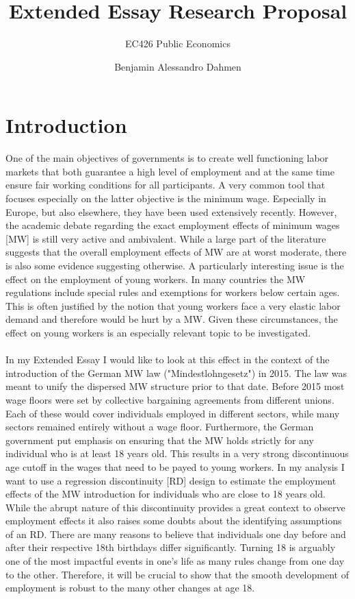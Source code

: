 \documentclass[11pt]{scrartcl}
\title{Extended Essay Research Proposal}
\subtitle{EC426 Public Economics}
\author{Benjamin Alessandro Dahmen}
\begin{document}
	\maketitle
	
\section{Introduction}
One of the main objectives of governments is to create well functioning labor markets that both guarantee a high level of employment and at the same time ensure fair working conditions for all participants. A very common tool that focuses especially on the latter objective is the minimum wage. Especially in Europe, but also elsewhere, they have been used extensively recently. However, the academic debate regarding the exact employment effects of minimum wages [MW] is still very active and ambivalent. While a large part of the literature suggests that the overall employment effects of MW are at worst moderate, there is also some evidence suggesting otherwise. A particularly interesting issue is the effect on the employment of young workers. In many countries the MW regulations include special rules and exemptions for workers below certain ages. This is often justified by the notion that young workers face a very elastic labor demand and therefore would be hurt by a MW. Given these circumstances, the effect on young workers is an especially relevant topic to be investigated. \\ \\
In my Extended Essay I would like to look at this effect in the context of the introduction of the German MW law ("Mindestlohngesetz") in 2015. The law was meant to unify the dispersed MW structure prior to that date. Before 2015 most wage floors were set by collective bargaining agreements from different unions. Each of these would cover individuals employed in different sectors, while many sectors remained entirely without a wage floor. Furthermore, the German government put emphasis on ensuring that the MW holds strictly for any individual who is at least 18 years old. This results in a very strong discontinuous age cutoff in the wages that need to be payed to young workers. In my analysis I want to use a regression discontinuity [RD] design to estimate the employment effects of the MW introduction for individuals who are close to 18 years old. While the abrupt nature of this discontinuity provides a great context to observe employment effects it also raises some doubts about the identifying assumptions of an RD. There are many reasons to believe that individuals one day before and after their respective 18th birthdays differ significantly. Turning 18 is arguably one of the most impactful events in one's life as many rules change from one day to the other. Therefore, it will be crucial to show that the smooth development of employment is robust to the many other changes at age 18.
\end{document}
